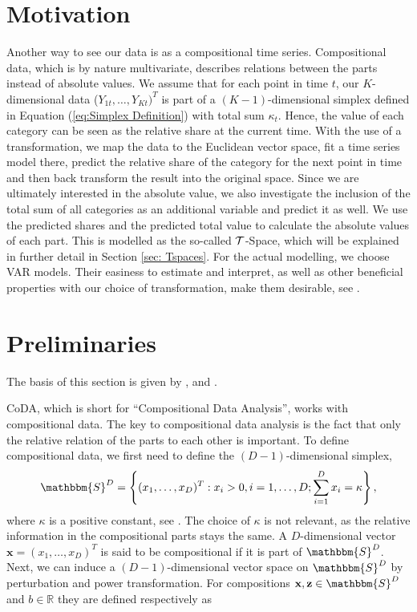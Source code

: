 \section{Motivation}
\label{sec: Coda Motivation}

Another way to see our data is as a compositional time series. Compositional data, which is by nature multivariate, describes relations between the parts instead of absolute values. We assume that for each point in time $t$, our $K$-dimensional data ($Y_{1t},\ldots,Y_{Kt})^T$ is part of a $(K-1)$-dimensional simplex defined in Equation (\ref{eq:Simplex Definition}) with total sum $\kappa_t$. Hence, the value of each category can be seen as the relative share at the current time. With the use of a transformation, we map the data to the Euclidean vector space, fit a time series model there, predict the relative share of the category for the next point in time and then back transform the result into the original space. Since we are ultimately interested in the absolute value, we also investigate the inclusion of the total sum of all categories as an additional variable and predict it as well. We use the predicted shares and the predicted total value to calculate the absolute values of each part. This is modelled as the so-called $\mathcal{T}$-Space, which will be explained in further detail in Section \ref{sec: Tspaces}. For the actual modelling, we choose VAR models. Their easiness to estimate and interpret, as well as other beneficial properties with our choice of transformation, make them desirable, see \textcite{Kynclova:2015}. 


\section{Preliminaries}
\label{sec: Coda Preliminaries}
The basis of this section is given by \textcite{Kynclova:2015}, \textcite{Egozcue:2003} and \textcite{Filzmoser:2020}.

CoDA, which is short for ``Compositional Data Analysis'', works with compositional data. The key to compositional data analysis is the fact that only the relative relation of the parts to each other is important. To define compositional data, we first need to define the $(D-1)$-dimensional simplex,
	\begin{equation}
	\mathbbm{S}^D = \left\{(x_1,\ldots, x_D)^T: x_i > 0, i =1,\ldots,D; \sum_{i=1}^{D}x_i=\kappa  \right\},
	\label{eq:Simplex Definition}
	\end{equation}
%
where $\kappa$ is a positive constant, see \textcite{Kynclova:2015}. The choice of $\kappa$ is not relevant, as the relative information in the compositional parts stays the same.  A $D$-dimensional vector $\textbf{x} = (x_1,\ldots,x_D)^T$ is said to be compositional if it is part of $\mathbbm{S}^D$. Next, we can induce a $(D-1)$-dimensional vector space on $\mathbbm{S}^D$ by perturbation and power transformation. For compositions $\textbf{x},\textbf{z} \in \mathbbm{S}^D$ and $b \in \mathbb{R}$ they are defined respectively as 


